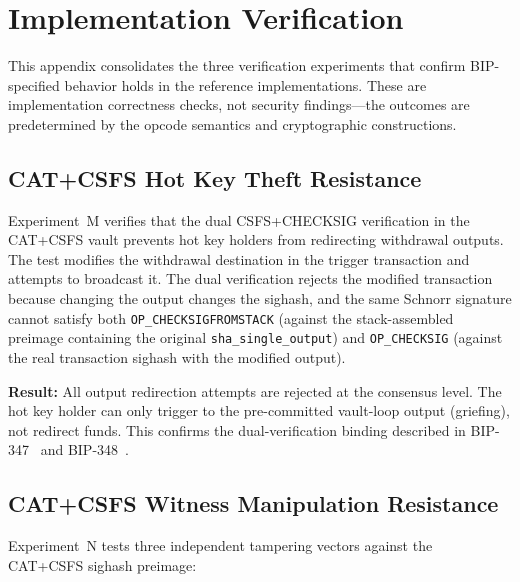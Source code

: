 \chapter{Implementation Verification} \label{app:verification}

This appendix consolidates the three verification experiments that confirm
BIP-specified behavior holds in the reference implementations. These are
implementation correctness checks, not security findings---the outcomes are
predetermined by the opcode semantics and cryptographic constructions.

\section{CAT+CSFS Hot Key Theft Resistance} \label{ase:hot_key}

Experiment~M verifies that the dual CSFS+CHECKSIG verification in the CAT+CSFS vault
prevents hot key holders from redirecting withdrawal outputs. The test modifies the
withdrawal destination in the trigger transaction and attempts to broadcast it. The
dual verification rejects the modified transaction because changing the output changes
the sighash, and the same Schnorr signature cannot satisfy both
\texttt{OP\_CHECKSIGFROMSTACK} (against the stack-assembled preimage containing the
original \texttt{sha\_single\_output}) and \texttt{OP\_CHECKSIG} (against the real
transaction sighash with the modified output).

\textbf{Result:} All output redirection attempts are rejected at the consensus level.
The hot key holder can only trigger to the pre-committed vault-loop output (griefing),
not redirect funds. This confirms the dual-verification binding described in
BIP-347~\cite{BIP347} and BIP-348~\cite{BIP348}.

\section{CAT+CSFS Witness Manipulation Resistance} \label{ase:witness}

Experiment~N tests three independent tampering vectors against the CAT+CSFS
sighash preimage:

